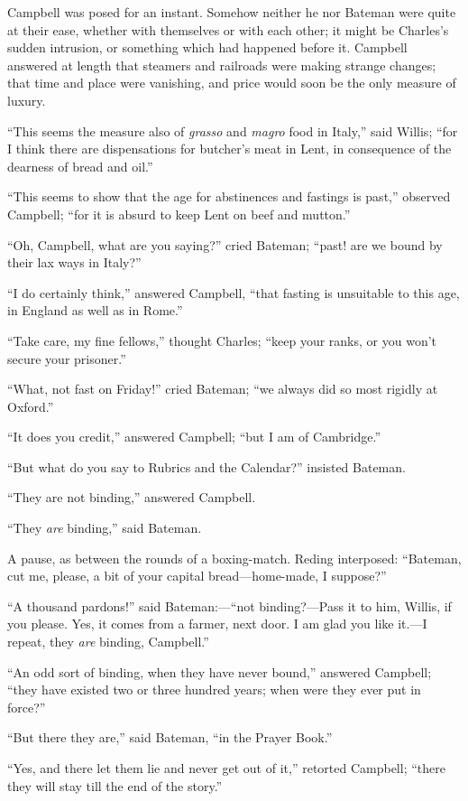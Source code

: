 Campbell was posed for an instant. Somehow neither he nor Bateman
were quite at their ease, whether with themselves or with each other;
it might be Charles's sudden intrusion, or something which had
happened before it. Campbell answered at length that steamers and
railroads were making strange changes; that time and place were
vanishing, and price would soon be the only measure of luxury.

``This seems the measure also of \emph{grasso} and \emph{magro}
food in Italy,'' said Willis; ``for I think there are
dispensations for butcher's meat in Lent, in consequence of the
dearness of bread and oil.''

``This seems to show that the age for abstinences and fastings
is past,'' observed Campbell; ``for it is absurd to keep Lent
on beef and mutton.''

``Oh, Campbell, what are you saying?'' cried Bateman;
``past! are we bound by their lax ways in Italy?''

``I do certainly think,'' answered Campbell, ``that
fasting is unsuitable to this age, in England as well as in
Rome.''

``Take care, my fine fellows,'' thought Charles; ``keep
your ranks, or you won't secure your prisoner.''

``What, not fast on Friday!'' cried Bateman; ``we
always did so most rigidly at Oxford.''

``It does you credit,'' answered Campbell; ``but I am
of Cambridge.''

``But what do you say to Rubrics and the Calendar?''
insisted Bateman.

``They are not binding,'' answered Campbell.

``They \emph{are} binding,'' said Bateman.

A pause, as between the rounds of a boxing-match. Reding
interposed: ``Bateman, cut me, please, a bit of your capital bread—home-made,
I suppose?''

``A thousand pardons!'' said Bateman:—``not binding?—Pass
it to him, Willis, if you please. Yes, it comes from a farmer, next
door. I am glad you like it.—I repeat, they \emph{are} binding,
Campbell.''

``An odd sort of binding, when they have never bound,''
answered Campbell; ``they have existed two or three hundred years;
when were they ever put in force?''

``But there they are,'' said Bateman, ``in the Prayer
Book.''

``Yes, and there let them lie and never get out of it,''
retorted Campbell; ``there they will stay till the end of the
story.''

